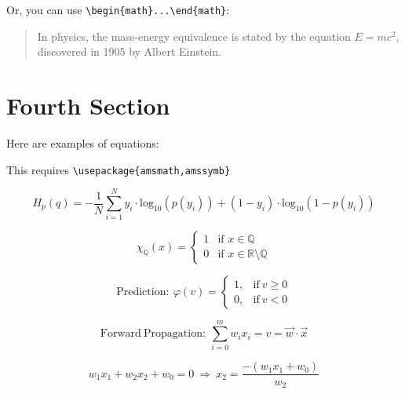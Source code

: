 \documentclass[letterpaper]{article} %
\begin{document}
\noindent Or, you can use \verb|\begin{math}...\end{math}|:

\begin{quote}
In physics, the mass-energy equivalence is stated 
by the equation \begin{math}E=mc^2\end{math}, discovered in 1905 by Albert Einstein.
\end{quote}

\medskip

\pagebreak

\section{Fourth Section}
Here are examples of equations:

\noindent This requires \verb|\usepackage{amsmath,amssymb}|

\begin{equation}
    H_p(q) = -\frac{1}{N} \sum_{i=1}^{N} y_i \cdot \mathrm{log}_{10}(p(y_i)) + (1-y_i) \cdot \mathrm{log}_{10}(1-p(y_i))
\end{equation}

\begin{equation}
\chi_{\mathbb{Q}}(x)=
    \begin{cases}
        1 & \text{if } x \in \mathbb{Q}\\
        0 & \text{if } x \in \mathbb{R}\setminus\mathbb{Q}
    \end{cases}
\end{equation}

\begin{equation}
    \mathrm{Prediction:} \ \varphi(v) = \begin{cases} 
        1, & \mathrm{if} \ v\ge 0 \\
        0, & \mathrm{if} \ v < 0 
     \end{cases}
\end{equation}

\begin{equation}
    \mathrm{Forward \ Propagation:} \ \sum_{i = 0}^{m} w_i x_i = v = \vec{w} \cdot \vec{x}
\end{equation}

\begin{equation}
    w_1x_1 + w_2x_2 + w_0 = 0 \ \Longrightarrow \ x_2 = \frac{-(w_1x_1 + w_0)}{w_2}
\end{equation}

\medskip

\pagebreak



\end{document}

